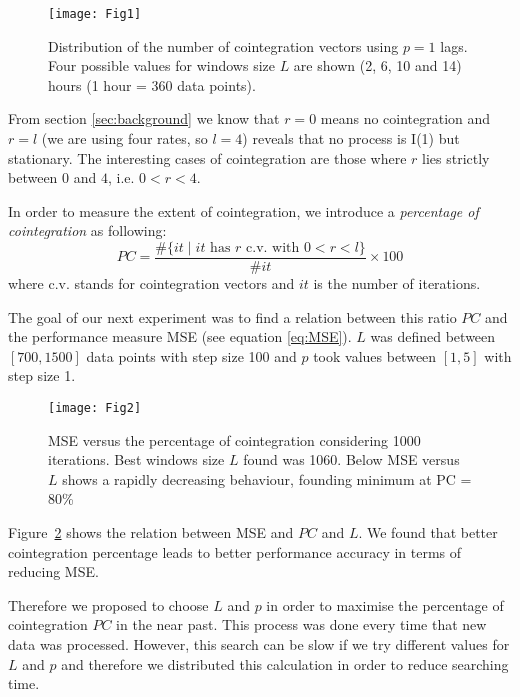 \begin{figure}[!h]
  \centering
  \texttt{[image: Fig1]}
  \caption{Distribution of the number of cointegration vectors using $p=1$ lags.
  Four possible values for windows size $L$ are shown (2, 6, 10 and 14) hours (1
  hour = 360 data points).}
  \label{fig:hists}
\end{figure}


From section \ref{sec:background} we know that $r=0$ means no cointegration and
$r=l$ (we are using four rates, so $l=4$) reveals that no process is I(1) but
stationary.  The interesting cases of cointegration are those where $r$ lies
strictly between $0$ and $4$, i.e. $0<r<4$.

In order to measure the extent of cointegration, we introduce a
{\em percentage of cointegration\/} as following:
\begin{equation} \label{eq:pcoint}
PC = 
\frac{\#\{ it \mid \text{$it$ has $r$ c.v. with $0<r<l$}\}}
     {\#it}\times 100
\end{equation}
where c.v. stands for cointegration vectors and $it$ is the number of iterations.

The goal of our next experiment was to find a relation between this ratio $PC$
and the performance measure MSE (see equation \ref{eq:MSE}). $L$ was defined
between $[700,1500]$ data points with step size 100 and $p$ took values between
$[1,5]$ with step size 1.  

\begin{figure}[ht!]
  \centering
  \texttt{[image: Fig2]}
  \caption{MSE versus the percentage of cointegration considering 1000
  iterations. Best windows size $L$ found was 1060. Below MSE versus $L$ shows a
  rapidly decreasing behaviour, founding minimum at PC = 80\% }
  \label{fig:cointvsmse}
\end{figure}

Figure~\ref{fig:cointvsmse} shows the relation between MSE and $PC$ and $L$.  We
found that better cointegration percentage leads to better performance accuracy
in terms of reducing MSE.

Therefore we proposed to choose $L$ and $p$ in order to maximise the percentage
of cointegration $PC$ in the near past. This process was done every time that
new data was processed. However, this search can be slow if we try different
values for $L$ and $p$ and therefore we distributed this calculation in order to
reduce searching time.

